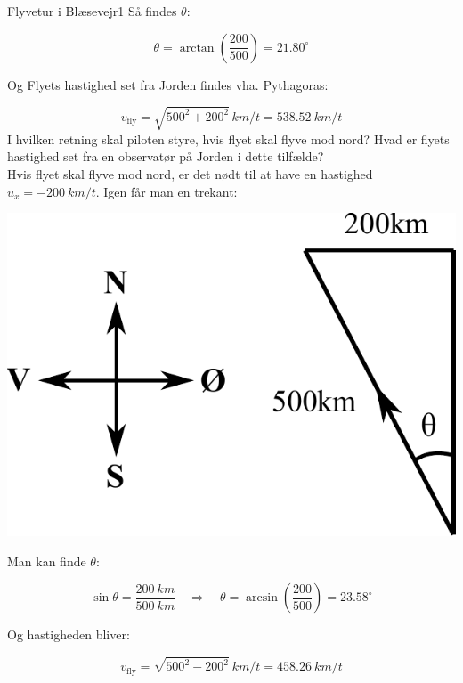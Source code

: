 \begin{opgave}{Flyvetur i Blæsevejr}{1}
	Så findes $\theta$:
	
	$$\theta = \arctan \left( \frac{200}{500} \right) = 21.80^\circ$$
	
	\vspace{2mm}
	
	Og Flyets hastighed set fra Jorden findes vha. Pythagoras:
	
	$$v_{\text{fly}} = \sqrt{500^2 + 200^2} \, \si{km/t} = \SI{538.52}{km/t} $$
	\opg I hvilken retning skal piloten styre, hvis flyet skal flyve mod nord? Hvad er flyets hastighed set fra en observatør på Jorden i dette tilfælde?\\
	
	Hvis flyet skal flyve mod nord, er det nødt til at have en hastighed $u_x = - \SI{200}{km/t}$. Igen får man en trekant:
	
	\begin{center}
		\includegraphics[scale=0.8]{Relativitetsteori/fly_fig2.pdf}
	\end{center}

	Man kan finde $\theta$:
	
	$$\sin \theta = \frac{\SI{200}{km}}{\SI{500}{km}} \quad \Rightarrow \quad \theta = \arcsin \left( \frac{200}{500} \right) = 23.58^\circ$$
	
	Og hastigheden bliver:
	
	$$v_{\text{fly}} = \sqrt{500^2 - 200^2} \ \si{km/t} = \SI{458.26}{km / t}$$
\end{opgave}

